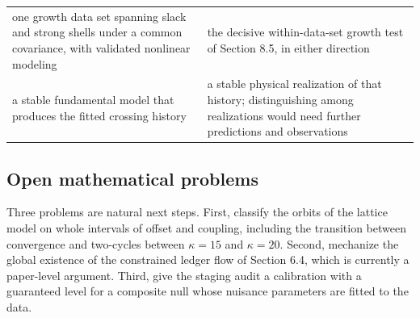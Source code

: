 \begin{longtable}[]{@{}ll@{}}
\begin{minipage}[t]{0.47\columnwidth}
one growth data set spanning slack and strong shells under a common
covariance, with validated nonlinear modeling\strut
\end{minipage} & \begin{minipage}[t]{0.47\columnwidth}\raggedright
the decisive within-data-set growth test of Section 8.5, in either
direction\strut
\end{minipage}\tabularnewline
\begin{minipage}[t]{0.47\columnwidth}\raggedright
a stable fundamental model that produces the fitted crossing
history\strut
\end{minipage} & \begin{minipage}[t]{0.47\columnwidth}\raggedright
a stable physical realization of that history; distinguishing among
realizations would need further predictions and observations\strut
\end{minipage}\tabularnewline
\bottomrule
\end{longtable}
\addtocounter{table}{-1}

\hypertarget{open-mathematical-problems}{%
\subsection{Open mathematical
problems}\label{open-mathematical-problems}}

Three problems are natural next steps. First, classify the orbits of the
lattice model on whole intervals of offset and coupling, including the
transition between convergence and two-cycles between \(\kappa=15\) and
\(\kappa=20\). Second, mechanize the global existence of the constrained
ledger flow of Section 6.4, which is currently a paper-level argument.
Third, give the staging audit a calibration with a guaranteed level for
a composite null whose nuisance parameters are fitted to the data.
